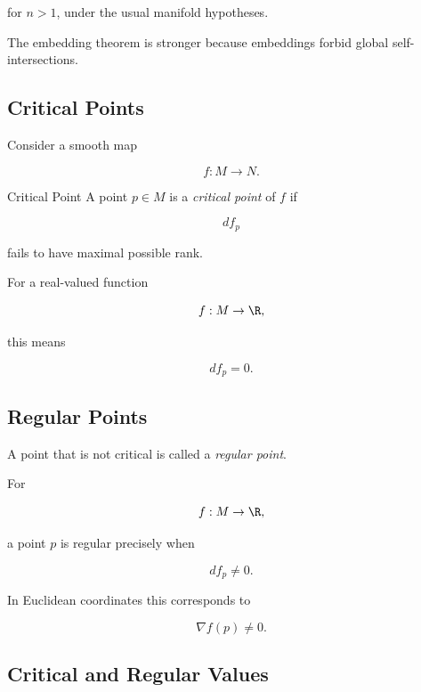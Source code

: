 for \(n>1\), under the usual manifold hypotheses.

The embedding theorem is stronger because embeddings forbid global
self-intersections.

\subsection{Critical Points}
\label{subsec:critical-points-differential-topology}

Consider a smooth map

\[
f:M\to N.
\]

\begin{definitionbox}{Critical Point}
A point \(p\in M\) is a \emph{critical point} of \(f\) if

\[
\boxed{
df_p
}
\]

fails to have maximal possible rank.
\end{definitionbox}

For a real-valued function

\[
f:M\to\R,
\]

this means

\[
\boxed{
df_p=0.
}
\]

\subsection{Regular Points}
\label{subsec:regular-points}

A point that is not critical is called a \emph{regular point}.

For

\[
f:M\to\R,
\]

a point \(p\) is regular precisely when

\[
\boxed{
df_p\neq0.
}
\]

In Euclidean coordinates this corresponds to

\[
\boxed{
\nabla f(p)\neq0.
}
\]

\subsection{Critical and Regular Values}
\label{subsec:critical-regular-values}


